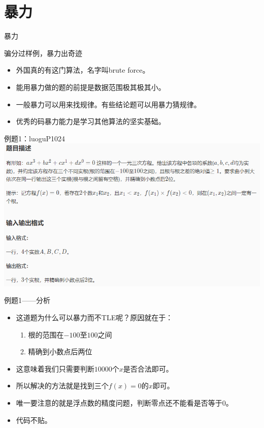 \documentclass{beamer}[UTF-8]
\begin{document}
\section{暴力} %
\begin{frame}{暴力}
\begin{center} 骗分过样例，暴力出奇迹 \end{center} \pause
\begin{itemize}
\item 外国真的有这门算法，名字叫brute force。 \pause
\item 能用暴力做的题的前提是数据范围极其极其小。 \pause
\item 一般暴力可以用来找规律。有些结论题可以用暴力猜规律。 \pause
\item 优秀的码暴力能力是学习其他算法的坚实基础。
\end{itemize}
\end{frame}

\begin{frame}{例题1：luoguP1024}
\includegraphics[width=\textwidth, height=\textheight]{luoguP1024.png}
\end{frame}

\begin{frame}{例题1——分析}
 \pause
\begin{itemize}
\item 这道题为什么可以暴力而不TLE呢？原因就在于： \pause
\begin{enumerate}
\item 根的范围在$-100$至$100$之间 \pause
\item 精确到小数点后两位 \pause
\end{enumerate}
\item 这意味着我们只需要判断$10000$个$x$是否合法即可。 \pause
\item 所以解决的方法就是找到三个$f(x)=0$的$x$即可。 \pause
\item 唯一要注意的就是浮点数的精度问题，判断零点还不能看是否等于$0$。 \pause
\item 代码不贴。
\end{itemize}
\end{frame}
\end{document}

